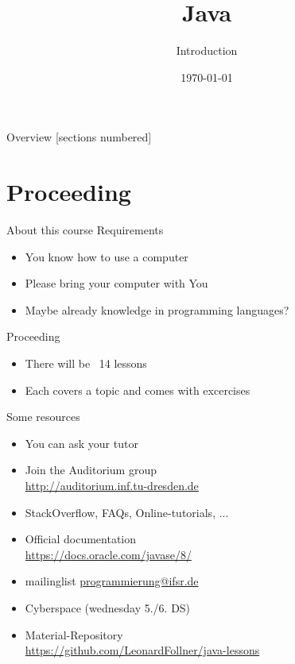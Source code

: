 


\title{Java}
\subtitle{Introduction}
\date{\today}




\begin{frame}
	\titlepage
\end{frame}
\begin{frame}{Overview}
	[sections numbered]
	\tableofcontents
\end{frame}

\section{Proceeding}
\begin{frame}{About this course}
	Requirements
	\begin{itemize}
		\item You know how to use a computer
        \item Please bring your computer with You
		\item Maybe already knowledge in programming languages?
	\end{itemize}
	Proceeding
	\begin{itemize}
		\item There will be ~14 lessons
		\item Each covers a topic and comes with excercises
	\end{itemize}
\end{frame}

\begin{frame}{Some resources}
	\begin{itemize}
		\item You can ask your tutor
		\item Join the Auditorium group \hfill \\
			\url{http://auditorium.inf.tu-dresden.de}
		\item StackOverflow, FAQs, Online-tutorials, ... \hfill \\
		\item Official documentation \hfill \\
			\url{https://docs.oracle.com/javase/8/}
        \item mailinglist \url{programmierung@ifsr.de}
        \item Cyberspace (wednesday 5./6. DS)
		\item Material-Repository \\
			\url{https://github.com/LeonardFollner/java-lessons}
	\end{itemize}
\end{frame}

